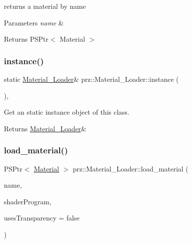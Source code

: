 returns a material by name 


\begin{DoxyParams}{Parameters}
{\em name} & \\
\hline
\end{DoxyParams}
\begin{DoxyReturn}{Returns}
P\+S\+Ptr$<$ Material $>$ 
\end{DoxyReturn}
\mbox{\label{classprz_1_1_material___loader_a5fa3903db95525602037c029debb6532}} 
\subsubsection{\texorpdfstring{instance()}{instance()}}
{\footnotesize\ttfamily static \mbox{\hyperlink{classprz_1_1_material___loader}{Material\+\_\+\+Loader}}\& prz\+::\+Material\+\_\+\+Loader\+::instance (\begin{DoxyParamCaption}{ }\end{DoxyParamCaption})\hspace{0.3cm}{\ttfamily [inline]}, {\ttfamily [static]}}



Get an static instance object of this class. 

\begin{DoxyReturn}{Returns}
\mbox{\hyperlink{classprz_1_1_material___loader}{Material\+\_\+\+Loader}}\& 
\end{DoxyReturn}
\mbox{\label{classprz_1_1_material___loader_a384534b5e8e8a558a0ad4df508ec5c33}} 
\subsubsection{\texorpdfstring{load\_material()}{load\_material()}\hspace{0.1cm}{\footnotesize\ttfamily [1/3]}}
{\footnotesize\ttfamily P\+S\+Ptr$<$ \mbox{\hyperlink{classprz_1_1_material}{Material}} $>$ prz\+::\+Material\+\_\+\+Loader\+::load\+\_\+material (\begin{DoxyParamCaption}\item[{const P\+String \&}]{name,  }\item[{P\+S\+Ptr$<$ \mbox{\hyperlink{classprz_1_1_shader___program}{Shader\+\_\+\+Program}} $>$}]{shader\+Program,  }\item[{bool}]{uses\+Transparency = {\ttfamily false} }\end{DoxyParamCaption})}



